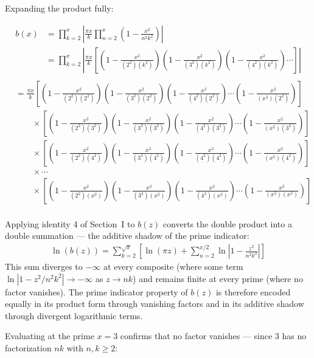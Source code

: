 \documentclass{article}
\begin{document}
\pagebreak

Expanding the product fully:

\begin{align*}
b(x) &= \prod_{k=2}^{x} \left|\frac{\pi x}{k} \prod_{n=2}^{x} \left( 1 - \frac{x^2}{n^2 k^2} \right) \right| \\
&= \prod_{k=2}^{x} \left|\frac{\pi x}{k} \left[ \left( 1 - \frac{x^2}{(2^2)(k^2)}\right) \left( 1 - \frac{x^2}{(3^2)(k^2)}\right) \left( 1 - \frac{x^2}{(4^2)(k^2)}\right) \cdots \right]\right| \\
\end{align*}
\begin{align*}
&= \frac{\pi x}{k}\left[ \left( 1 - \frac{x^2}{(2^2)(2^2)}\right) \left( 1 - \frac{x^2}{(3^2)(2^2)}\right) \left( 1 - \frac{x^2}{(4^2)(2^2)}\right) \cdots \left( 1 - \frac{x^2}{(x^2)(2^2)}\right)\right] \\
&\qquad \times \left[ \left( 1 - \frac{x^2}{(2^2)(3^2)}\right) \left( 1 - \frac{x^2}{(3^2)(3^2)}\right) \left( 1 - \frac{x^2}{(4^2)(3^2)}\right) \cdots \left( 1 - \frac{x^2}{(x^2)(3^2)}\right)\right] \\
&\qquad \times \left[ \left( 1 - \frac{x^2}{(2^2)(4^2)}\right) \left( 1 - \frac{x^2}{(3^2)(4^2)}\right) \left( 1 - \frac{x^2}{(4^2)(4^2)}\right) \cdots \left( 1 - \frac{x^2}{(x^2)(4^2)}\right)\right] \\
&\qquad \times \cdots \\
&\qquad \times \left[ \left( 1 - \frac{x^2}{(2^2)(x^2)}\right) \left( 1 - \frac{x^2}{(3^2)(x^2)}\right) \left( 1 - \frac{x^2}{(4^2)(x^2)}\right) \cdots \left( 1 - \frac{x^2}{(x^2)(x^2)}\right)\right] \\
\end{align*}

Applying identity 4 of Section~I to $b(z)$ converts the double product into a double summation --- the additive shadow of the prime indicator:
\begin{align*}
\ln(b(z)) = \sum_{k=2}^{\sqrt{x}}\left[\ln(\pi z) + \sum_{n=2}^{x/2} \ln\!\left|1 - \frac{z^2}{n^2k^2}\right|\right]
\end{align*}
This sum diverges to $-\infty$ at every composite (where some term $\ln|1 - z^2/n^2k^2| \to -\infty$ as $z \to nk$) and remains finite at every prime (where no factor vanishes). The prime indicator property of $b(z)$ is therefore encoded equally in its product form through vanishing factors and in its additive shadow through divergent logarithmic terms.

\newpage
Evaluating at the prime $x = 3$ confirms that no factor vanishes — since $3$ has no factorization $nk$ with $n, k \geq 2$:
\end{document}
